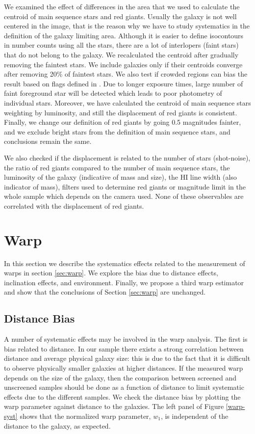 \documentclass[useAMS,usenatbib,twocolumn]{mn2e}
\begin{document}
We examined the effect of differences in
the area that we used to calculate the centroid of main sequence stars and red
giants. Usually the galaxy is not well centered in the image, that is the
reason why we have to study systematics in the definition of 
the galaxy limiting area. Although it is easier to define isocontours in
number counts using all the stars, there are a lot of interlopers (faint stars)
that do not belong to the galaxy. We recalculated the centroid
after gradually removing the faintest stars. We include galaxies only if their
centroids converge after removing 20\% of faintest stars.
We also test if crowded regions can bias the result based on flags defined in
\citet{dalcanton09}. Due to longer exposure times, large number of faint
foreground star will be detected which leads to poor photometry of individual
stars. Moreover, we have calculated the centroid of main sequence stars
weighting by luminosity, and still the displacement of red giants is consistent.
Finally, we change our definition of red giants by going 0.5
magnitudes fainter, and we exclude bright stars from the definition of
main sequence stars, and conclusions remain the same. 


We also checked if the displacement is related to the number of stars
(shot-noise), the ratio of red giants compared to the number of main sequence
stars,
the luminosity of the galaxy (indicative of mass and size),  the HI line
width (also indicator of mass), filters used to determine red giants or
magnitude limit in the whole sample which depends on the
camera used. None of these observables are correlated with the
displacement of red giants.


\section{Warp}
\label{ap:warp}
In this section we describe the systematics effects related to the measurement of warps in
section \ref{sec:warp}.
We explore the bias due to distance effects, inclination effects,
and environment.  Finally, we propose a third warp estimator
and show that the conclusions of Section \ref{sec:warp} are unchanged.
 
\subsection{Distance Bias}
\label{ap:distance-systematic}
A number of systematic effects may be involved in the warp analysis.
The first is bias related to distance.
In our sample there exists a strong correlation between
distance and average physical galaxy size:
this is due to the fact that it is difficult to observe physically
smaller galaxies at higher distances. If the measured warp depends on the
size of the galaxy, then the comparison between screened and unscreened
samples should be done as a function of distance to limit systematic effects
due to the different samples.
We check the distance bias by plotting the warp parameter against
distance to the galaxies. The left panel of Figure \ref{warp-syst} shows that
the normalized warp parameter, $w_1$, is independent of the distance to
the galaxy, as expected.
\end{document}
